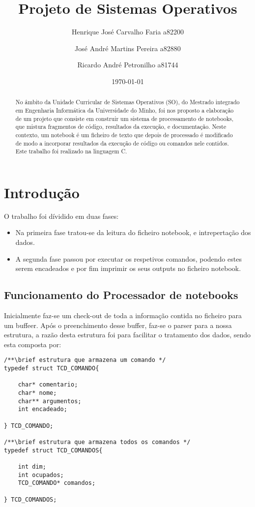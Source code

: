 \documentclass[4apaper]{report}
\title{Projeto de Sistemas Operativos}
\author{Henrique José Carvalho Faria a82200\and José André Martins Pereira a82880 \and Ricardo André Petronilho a81744}
\date{\today}
\begin{document}
\maketitle

\begin{abstract}
No âmbito da Unidade Curricular de Sistemas Operativos (SO), do Mestrado integrado em Engenharia Informática da Universidade do Minho, foi nos proposto a elaboração de um projeto que consiste em construir um sistema de processamento de notebooks, que mistura fragmentos de código, resultados da execução, e documentação. Neste contexto, um notebook é um ficheiro de texto que depois de processado é modificado de modo a incorporar resultados da execução de código ou comandos nele contidos. Este trabalho foi realizado na linguagem C.
\end{abstract}

\tableofcontents

\newpage

\chapter{Introdução}
\label{sec:introducao}

O trabalho foi dívidido em duas fases:

\begin{itemize}
	\item Na primeira fase tratou-se da leitura do ficheiro notebook, e intrepertação dos dados.

	\item A segunda fase passou por executar os respetivos comandos, podendo estes serem encadeados e por fim imprimir os seus outputs no ficheiro notebook.
\end{itemize}

\newpage

\section{Funcionamento do Processador de notebooks}

Inicialmente faz-se um check-out de toda a informação contida no ficheiro para um buffeer. Após o preenchimento desse buffer, faz-se o parser para a nossa estrutura, a razão desta estrutura foi para facilitar o tratamento dos dados, sendo esta composta por:
\begin{verbatim}
/**\brief estrutura que armazena um comando */
typedef struct TCD_COMANDO{

	char* comentario;
	char* nome;
	char** argumentos;
	int encadeado;

} TCD_COMANDO;

/**\brief estrutura que armazena todos os comandos */
typedef struct TCD_COMANDOS{

	int dim;
	int ocupados;
	TCD_COMANDO* comandos;

} TCD_COMANDOS;

\end{verbatim}
\end{document}
